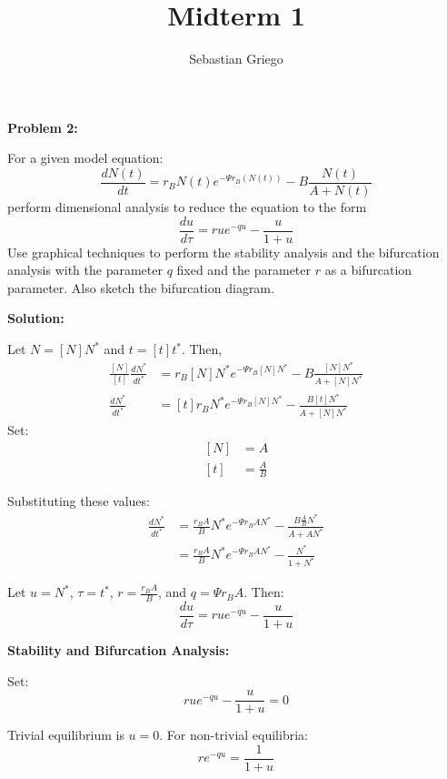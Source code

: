 \documentclass[12pt]{article}
\newenvironment{problem}[1]{
    \textbf{Problem #1:}
}{
    \rmfamily \vspace{1em}
}
\newenvironment{solution}{
    \textbf{Solution:}
    
}{
    
    \vspace{2em}
}
\begin{document}
\title{Midterm 1}  %
\author{Sebastian Griego}  %


\begin{problem}{2}
    For a given model equation:
    \[
        \frac{dN(t)}{dt} = r_B N(t) e^{-\Psi r_B(N(t))} - B\frac{N(t)}{A + N(t)}
    \]
    perform dimensional analysis to reduce the equation to the form 
    \[
        \frac{du}{d\tau} = r u e^{-qu} - \frac{u}{1 + u}
    \]
    Use graphical techniques to perform the stability analysis and the bifurcation analysis with the parameter \( q \) fixed and the parameter \( r \) as a bifurcation parameter. Also sketch the bifurcation diagram.
\end{problem}

\begin{solution}
    Let \( N = [N]N^* \) and \( t = [t]t^* \). Then,
    \[
        \begin{aligned}
            \frac{[N]}{[t]} \frac{dN^*}{dt^*} &= r_B [N]N^* e^{-\Psi r_B [N]N^*} - B \frac{[N]N^*}{A + [N]N^*} \\
            \frac{dN^*}{dt^*} &= [t]r_B N^* e^{-\Psi r_B [N]N^*} - \frac{B [t]N^*}{A + [N]N^*}
        \end{aligned}
    \]
    Set:
    \[
        \begin{aligned}
            [N] &= A \\
            [t] &= \frac{A}{B}
        \end{aligned}
    \]
    
    Substituting these values:
    \[
        \begin{aligned}
            \frac{dN^*}{dt^*} &= \frac{r_B A}{B} N^* e^{-\Psi r_B A N^*} - \frac{B \frac{A}{B} N^*}{A + A N^*} \\
            &= \frac{r_B A}{B} N^* e^{-\Psi r_B A N^*} - \frac{N^*}{1 + N^*}
        \end{aligned}
    \]
    
    Let \( u = N^* \), \( \tau = t^* \), \( r = \frac{r_B A}{B} \), and \( q = \Psi r_B A \). Then:
    \[
        \frac{du}{d\tau} = r u e^{-qu} - \frac{u}{1 + u}
    \]
    
    \textbf{Stability and Bifurcation Analysis:}
    
    Set:
    \[
        r u e^{-qu} - \frac{u}{1 + u} = 0
    \]
    
    Trivial equilibrium is \( u = 0 \). For non-trivial equilibria:
    \[
        r e^{-qu} = \frac{1}{1 + u}
    \]
    

\end{solution}
\end{document}
